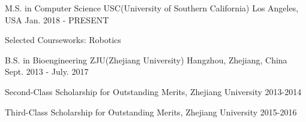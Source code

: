 


\begin{cventries}

\cventry
{M.S. in Computer Science} %
{USC(University of Southern California)} %
{Los Angeles, USA} %
{Jan. 2018 - PRESENT} %
{%
\begin{cvitems}
\item {Selected Courseworks: Robotics}
\end{cvitems}
}

\cventry
{B.S. in Bioengineering} %
{ZJU(Zhejiang University)} %
{Hangzhou, Zhejiang, China} %
{Sept. 2013 - July. 2017} %
{ %
\begin{cvitems}
\item {Second-Class Scholarship for Outstanding Merits, Zhejiang University    2013-2014}
\item {Third-Class Scholarship for Outstanding Merits, Zhejiang University    2015-2016}
\end{cvitems}
}

\end{cventries}